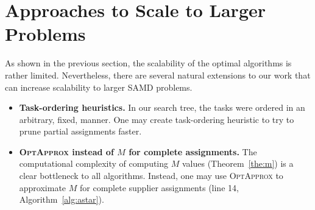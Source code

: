 \documentclass[letterpaper]{article} %
\newcommand{\samd}{\ac{SAMD}\xspace}
\newcommand{\optapprox}{\textsc{OptApprox}\xspace}
\begin{document}









\section{Approaches to Scale to Larger Problems}
\label{sec:scale}

As shown in the previous section, the scalability of the optimal algorithms is rather limited. Nevertheless, there are several natural extensions to our work that can increase scalability to larger \samd problems.
\begin{itemize}
    \item \textbf{Task-ordering heuristics.} In our search tree, the tasks were ordered in an arbitrary, fixed, manner. One may create task-ordering heuristic to try to prune partial assignments faster. 
    \item \textbf{\optapprox instead of $M$ for complete assignments.} 
    The computational complexity of computing $M$ values (Theorem~\ref{the:m}) is a clear bottleneck to all algorithms. Instead, one may use \optapprox to approximate $M$ for complete supplier assignments (line 14, Algorithm~\ref{alg:astar}). 
\end{itemize}
\end{document}
